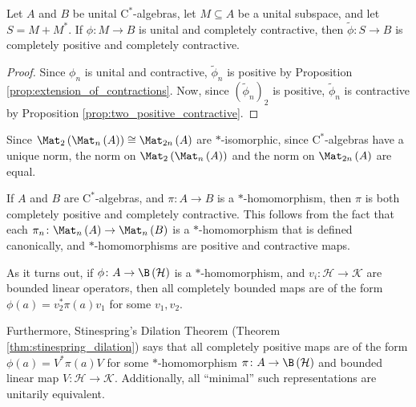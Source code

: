 \begin{proposition}
  Let $A$ and $B$ be unital $\mathrm{C}^{\ast}$-algebras, let $M\subseteq A$ be a unital subspace, and let $S = M + M^{\ast}$. If $\phi\colon M\rightarrow B$ is unital and completely contractive, then $\widetilde{\phi}\colon S\rightarrow B$ is completely positive and completely contractive.
\end{proposition}
\begin{proof}
  Since $\phi_n$ is unital and contractive, $\widetilde{\phi}_n$ is positive by Proposition \ref{prop:extension_of_contractions}. Now, since $\left( \widetilde{\phi}_n \right)_{2}$ is positive, $\widetilde{\phi}_n$ is contractive by Proposition \ref{prop:two_positive_contractive}. 
\end{proof}
\begin{remark}
  Since $\Mat_{2}\left( \Mat_n\left( A \right) \right)\cong \Mat_{2n}\left( A \right)$ are $\ast $-isomorphic, since $\mathrm{C}^{\ast}$-algebras have a unique norm, the norm on $\Mat_{2}\left( \Mat_n\left( A \right) \right)$ and the norm on $\Mat_{2n}\left( A \right)$ are equal.
\end{remark}
\begin{example}
  If $A$ and $B$ are $\mathrm{C}^{\ast}$-algebras, and $\pi\colon A\rightarrow B$ is a $\ast$-homomorphism, then $\pi$ is both completely positive and completely contractive. This follows from the fact that each $\pi_n\colon \Mat_n\left( A \right)\rightarrow \Mat_n\left( B \right)$ is a $\ast$-homomorphism that is defined canonically, and $\ast$-homomorphisms are positive and contractive maps.
\end{example}
\begin{remark}
  As it turns out, if $\phi\colon A\rightarrow \B\left( \mathcal{H} \right)$ is a $\ast$-homomorphism, and $v_i\colon \mathcal{H}\rightarrow \mathcal{K}$ are bounded linear operators, then all completely bounded maps are of the form $\phi\left( a \right) = v_2^{\ast}\pi(a)v_1$ for some $v_1,v_2$.\newline

  Furthermore, Stinespring's Dilation Theorem (Theorem \ref{thm:stinespring_dilation}) says that all completely positive maps are of the form $\phi\left( a \right) = V^{\ast}\pi(a)V$ for some $\ast$-homomorphism $\pi\colon A\rightarrow \B\left( \mathcal{H} \right)$ and bounded linear map $V\colon \mathcal{H}\rightarrow \mathcal{K}$. Additionally, all ``minimal'' such representations are unitarily equivalent.
\end{remark}
